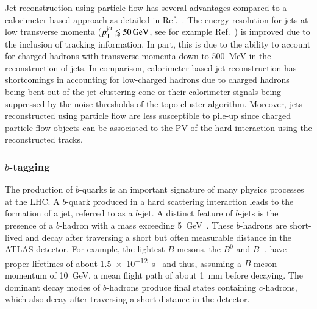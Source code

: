 Jet reconstruction using particle flow has several advantages compared to a
calorimeter-based approach as detailed in Ref.~\cite{PERF-2015-09}. The energy
resolution for jets at low transverse momenta
($p_{\text{T}}^{\text{jet}} \lessapprox \SI{50}{\ensuremath{\text{GeV}}}$, see for example
Ref.~\cite{JETM-2018-05}) is improved due to the inclusion of tracking
information. In part, this is due to the ability to account for charged hadrons
with transverse momenta down to \SI{500}{\MeV} in the reconstruction of jets. In
comparison, calorimeter-based jet reconstruction has shortcomings in accounting
for low-\pT charged hadrons due to charged hadrons being bent out of the jet
clustering cone or their calorimeter signals being suppressed by the noise
thresholds of the topo-cluster algorithm. Moreover, jets reconstructed using
particle flow are less susceptible to pile-up since charged particle flow
objects can be associated to the PV of the hard interaction using the
reconstructed tracks.


\subsubsection{$b$-tagging}

The production of $b$-quarks is an important signature of many physics processes
at the LHC. A $b$-quark produced in a hard scattering interaction leads to the
formation of a jet, referred to as a $b$-jet. A distinct feature of $b$-jets is
the presence of a $b$-hadron with a mass exceeding \SI{5}{\GeV}~\cite{pdg2020}.
These $b$-hadrons are short-lived and decay after traversing a short but often
measurable distance in the ATLAS detector. For example, the lightest $B$-mesons,
the $B^0$ and $B^\pm$, have proper lifetimes of about
\SI{1.5e-12}{\second}~\cite{pdg2020} and thus, assuming a $B$ meson momentum of
\SI{10}{\GeV}, a mean flight path of about \SI{1}{\milli\metre} before
decaying. The dominant decay modes of $b$-hadrons produce final states
containing $c$-hadrons, which also decay after traversing a short distance in
the detector.


